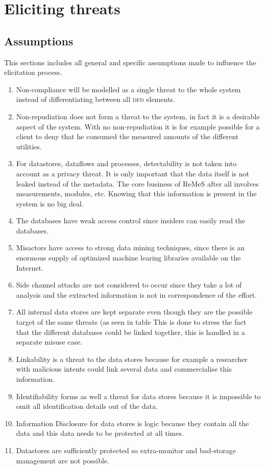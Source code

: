 \section{Eliciting threats}
\label{sec:eliciting-threats}

\subsection{Assumptions}

\npar This sections includes all general and specific assumptions made to
influence the elicitation process.

\begin{enumerate}

  \item Non-compliance will be modelled as a single threat to the whole system
  instead of differentiating between all \textsc{dfd} elements.
  \item Non-repudiation does not form a threat to the system, in fact it is a
  desirable aspect of the system. With no non-repudiation it is for
  example possible for a client to deny that he consumed the measured amounts
  of the different utilities.
  \item For datastores, dataflows and processes, detectability is not taken into
  account as a privacy threat. It is only important that the data itself is not
  leaked instead of the metadata. The core business of ReMeS after all involves
  measurements, modules, etc. Knowing that this information is present in the
  system is no big deal.
  \item The databases have weak access control since insiders can easily read
  the databases.
  \item Misactors have access to strong data mining techniques, since
  there is an enormous supply of optimized machine learing libraries available
  on the Internet.
  \item Side channel attacks are not considered to occur since they take a lot
  of analysis and the extracted information is not in correspondence of the
  effort.
   
  \item All internal data stores are kept separate even though they are the
  possible target of the same threats (as seen in table %
  This is done to stress the fact that the different databases could be linked
  together, this is handled in a separate misuse case.
  \item Linkability is a threat to the data stores because for example a
  researcher with malicious intents could link several data and commercialise
  this information.
  \item Identifiability forms as well a threat for data stores because it is
  impossible to omit all identification details out of the data. 
  \item Information Disclosure for data stores is logic because they contain all
  the data and this data needs to be protected at all times.
  \item Datastores are sufficiently protected so extra-monitor and bad-storage
  management are not possible.
  

\end{enumerate}
